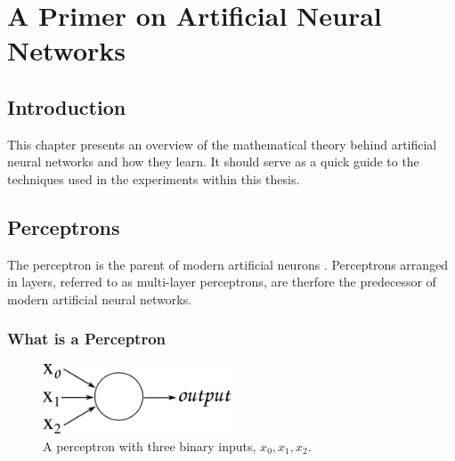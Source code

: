 \chapter{A Primer on Artificial Neural Networks} %

\label{Chapter3} %


\section{Introduction}
This chapter presents an overview of the mathematical theory behind artificial neural networks and how they learn. It should serve as a quick guide to the techniques used in the experiments within this thesis.

\section{Perceptrons}
\label{sec:percep}
The perceptron is the parent of modern artificial neurons \cite{rosenblatt1958perceptron}.
Perceptrons arranged in layers, referred to as multi-layer perceptrons, are therfore the predecessor of modern artificial neural networks.

\subsection{What is a Perceptron}



\begin{figure}
	\centering
	\includegraphics[width=0.5\textwidth]{Figs/intro2dl/perceptron.png}
	
	\caption{A perceptron with three binary inputs, $x_0, x_1, x_2$.}
	\label{fig:perceptron}
\end{figure}

